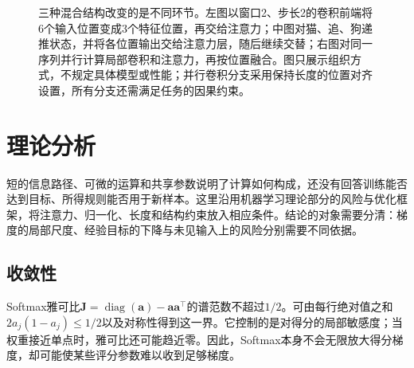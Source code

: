 \begin{figure}[htbp]
  \centering
  
  \caption{三种混合结构改变的是不同环节。左图以窗口2、步长2的卷积前端将6个输入位置变成3个特征位置，再交给注意力；中图对猫、追、狗递推状态，并将各位置输出交给注意力层，随后继续交替；右图对同一序列并行计算局部卷积和注意力，再按位置融合。图只展示组织方式，不规定具体模型或性能；并行卷积分支采用保持长度的位置对齐设置，所有分支还需满足任务的因果约束。}
  \label{fig:transformer-hybrid}
\end{figure}
\FloatBarrier

\section{理论分析}
\label{sec:transformer-theory}

短的信息路径、可微的运算和共享参数说明了计算如何构成，还没有回答训练能否达到目标、所得规则能否用于新样本。这里沿用机器学习理论部分的风险与优化框架，将注意力、归一化、长度和结构约束放入相应条件。结论的对象需要分清：梯度的局部尺度、经验目标的下降与未见输入上的风险分别需要不同依据。

\subsection{收敛性}
\label{sec:transformer-convergence}

Softmax雅可比$\bm J=\operatorname{diag}(\bm a)-\bm a\bm a^{\top}$的谱范数不超过$1/2$。可由每行绝对值之和$2a_j(1-a_j)\leq1/2$以及对称性得到这一界。它控制的是对得分的局部敏感度；当权重接近单点时，雅可比还可能趋近零。因此，Softmax本身不会无限放大得分梯度，却可能使某些评分参数难以收到足够梯度。

